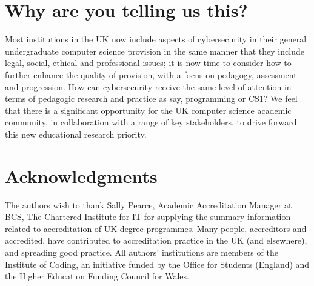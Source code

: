 \documentclass[sigconf]{acmart}
\begin{document}
\begin{comment}
It is the view of the authors that the computer science education community collectively should address these (and other emergent) issues related to the delivery of good quality embedded cybersecurity education.
\end{comment}

\section{Why are you telling us this?}	

Most institutions in the UK now include aspects of cybersecurity
in their general undergraduate computer science provision in the same manner that
they include legal, social, ethical and professional issues; it is now time to
consider how to further enhance the quality of provision, with a focus
on pedagogy, assessment and progression. How can cybersecurity
receive the same level of attention in terms of pedagogic research and
practice as say, programming or CS1? We feel that there is a significant opportunity for
the UK computer science academic community, in collaboration with a
range of key stakeholders, to drive forward this new educational
research priority.

\section{Acknowledgments}
The authors wish to thank Sally Pearce, Academic Accreditation Manager at BCS, The Chartered Institute for IT for supplying the summary information related to accreditation of UK degree programmes. Many people, accreditors and accredited, have contributed to accreditation practice in the UK (and elsewhere), and spreading good practice.  All authors' institutions are members of the Institute of Coding, an initiative funded by the Office for Students (England) and the Higher Education Funding Council for Wales.

%

\end{document}
